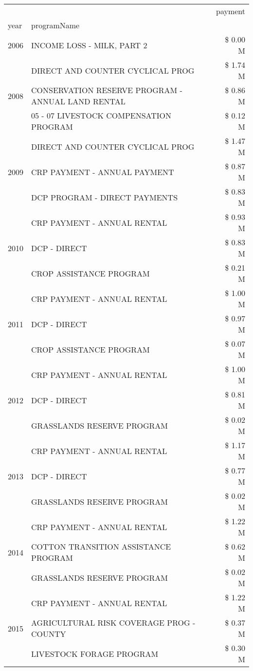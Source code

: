 \begin{tabular}{llr}
\toprule
 &  & payment \\
year & programName &  \\
\midrule
2006 & INCOME LOSS - MILK, PART 2 & \$ 0.00 M \\
\cline{1-3}
\multirow[t]{3}{*}{2008} & DIRECT AND COUNTER CYCLICAL PROG & \$ 1.74 M \\
 & CONSERVATION RESERVE PROGRAM - ANNUAL LAND RENTAL & \$ 0.86 M \\
 & 05 - 07 LIVESTOCK COMPENSATION PROGRAM & \$ 0.12 M \\
\cline{1-3}
\multirow[t]{3}{*}{2009} & DIRECT AND COUNTER CYCLICAL PROG & \$ 1.47 M \\
 & CRP PAYMENT - ANNUAL PAYMENT & \$ 0.87 M \\
 & DCP PROGRAM - DIRECT PAYMENTS & \$ 0.83 M \\
\cline{1-3}
\multirow[t]{3}{*}{2010} & CRP PAYMENT - ANNUAL RENTAL & \$ 0.93 M \\
 & DCP - DIRECT & \$ 0.83 M \\
 & CROP ASSISTANCE PROGRAM & \$ 0.21 M \\
\cline{1-3}
\multirow[t]{3}{*}{2011} & CRP PAYMENT - ANNUAL RENTAL & \$ 1.00 M \\
 & DCP - DIRECT & \$ 0.97 M \\
 & CROP ASSISTANCE PROGRAM & \$ 0.07 M \\
\cline{1-3}
\multirow[t]{3}{*}{2012} & CRP PAYMENT - ANNUAL RENTAL & \$ 1.00 M \\
 & DCP - DIRECT & \$ 0.81 M \\
 & GRASSLANDS RESERVE PROGRAM & \$ 0.02 M \\
\cline{1-3}
\multirow[t]{3}{*}{2013} & CRP PAYMENT - ANNUAL RENTAL & \$ 1.17 M \\
 & DCP - DIRECT & \$ 0.77 M \\
 & GRASSLANDS RESERVE PROGRAM & \$ 0.02 M \\
\cline{1-3}
\multirow[t]{3}{*}{2014} & CRP PAYMENT - ANNUAL RENTAL & \$ 1.22 M \\
 & COTTON TRANSITION ASSISTANCE PROGRAM & \$ 0.62 M \\
 & GRASSLANDS RESERVE PROGRAM & \$ 0.02 M \\
\cline{1-3}
\multirow[t]{3}{*}{2015} & CRP PAYMENT - ANNUAL RENTAL & \$ 1.22 M \\
 & AGRICULTURAL RISK COVERAGE PROG - COUNTY & \$ 0.37 M \\
 & LIVESTOCK FORAGE PROGRAM & \$ 0.30 M \\

\end{tabular}
